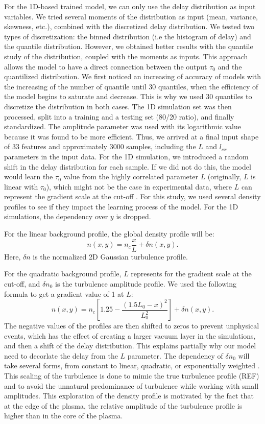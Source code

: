 \documentclass[11pt,openany]{report}
\begin{document}
\begin{multicols}{2}
    For the 1D-based trained model, we can only use the delay distribution as input variables. We tried several moments of the distribution as input (mean, variance, skewness, etc.), combined with the discretized delay distribution. We tested two types of discretization: the binned distribution (i.e the histogram of delay) and the quantile distribution. However, we obtained better results with the quantile study of the distribution, coupled with the moments as inputs. This approach allows the model to have a direct connection between the output $\tau_0$ and the quantilized distribution. We first noticed an increasing of accuracy of models with the increasing of the number of quantile until 30 quantiles, when the efficiency of the model begins to saturate and decrease. This is why we used 30 quantiles to discretize the distribution in both cases. The 1D simulation set was then processed, split into a training and a testing set (80/20 ratio), and finally standardized. The amplitude parameter was used with its logarithmic value because it was found to be more efficient. Thus, we arrived at a final input shape of 33 features and approximately 3000 samples, including the $L$ and $l_{cx}$ parameters in the input data. For the 1D simulation, we introduced a random shift in the delay distribution for each sample. If we did not do this, the model would learn the $\tau_0$ value from the highly correlated parameter $L$ (originally, $L$ is linear with $\tau_0$), which might not be the case in experimental data, where $L$ can represent the gradient scale at the cut-off \cite{Krutkin_thesis}. For this study, we used several density profiles to see if they impact the learning process of the model. For the 1D simulations, the dependency over $y$ is dropped.

    For the linear background profile, the global density profile will be:
    $$n(x,y) = n_c \frac{x}{L} +  \delta n(x,y).$$
    Here, $\delta n$ is the normalized 2D Gaussian turbulence profile.

    For the quadratic background profile, $L$ represents for the gradient scale at the cut-off, and $\delta n_0$ is the turbulence amplitude profile. We used the following formula to get a gradient value of 1 at $L$:
    $$n(x,y) = n_c \left[1.25 - \frac{(1.5L_0 - x)^2}{L_0^2} \right] +  \delta n(x,y).$$
    The negative values of the profiles are then shifted to zeros to prevent unphysical events, which has the effect of creating a larger vacuum layer in the simulations, and then a shift of the delay distribution. This explains partially why our model need to decorlate the delay from the $L$ parameter. The dependency of $\delta n_0$ will take several forms, from constant to linear, quadratic, or exponentially weighted \cite{SPR_Krutkin}. This scaling of the turbulence is done to mimic the true turbulence profile (REF) and to avoid the unnatural predominance of turbulence while working with small amplitudes. This exploration of the density profile is motivated by the fact that at the edge of the plasma, the relative amplitude of the turbulence profile is higher than in the core of the plasma.


\end{multicols}
\end{document}
